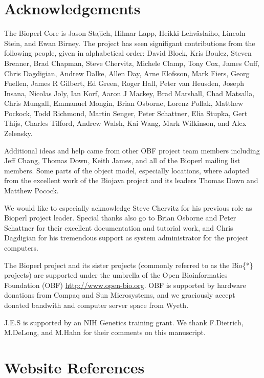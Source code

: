 \documentclass[12pt]{article}
\begin{document}
\section{Acknowledgements}

The Bioperl Core is Jason Stajich, Hilmar Lapp, Heikki
Lehv\"{a}slaiho, Lincoln Stein, and Ewan Birney.  The project has seen
signifigant contributions from the following people, given in
alphabetical order: David Block, Kris Boulez, Steven Brenner, Brad
Chapman, Steve Chervitz, Michele Clamp, Tony Cox, James Cuff, Chris
Dagdigian, Andrew Dalke, Allen Day, Arne Elofsson, Mark Fiers, Georg
Fuellen, James R Gilbert, Ed Green, Roger Hall, Peter van Heusden,
Joseph Insana, Nicolas Joly, Ian Korf, Aaron J Mackey, Brad Marshall,
Chad Matsalla, Chris Mungall, Emmanuel Mongin, Brian Osborne, Lorenz
Pollak, Matthew Pockock, Todd Richmond, Martin Senger, Peter
Schattner, Elia Stupka, Gert Thijs, Charles Tilford, Andrew Walsh, Kai
Wang, Mark Wilkinson, and Alex Zelensky.

Additional ideas and help came from other OBF project team members
including Jeff Chang, Thomas Down, Keith James, and all of the Bioperl
mailing list members. Some parts of the object model, especially
locations, where adopted from the excellent work of the Biojava
project and its leaders Thomas Down and Matthew Pocock.

We would like to especially acknowledge Steve Chervitz for his
previous role as Bioperl project leader.  Special thanks also go to
Brian Osborne and Peter Schattner for their excellent documentation
and tutorial work, and Chris Dagdigian for his tremendous support as
system administrator for the project computers.

The Bioperl project and its sister projects (commonly referred to as
the Bio\{*\} projects) are supported under the umbrella of the Open
Bioinformatics Foundation (OBF) \url{http://www.open-bio.org}.
OBF is supported by hardware donations from Compaq and Sun
Microsystems, and we graciously accept donated bandwith and computer
server space from Wyeth.

J.E.S is supported by an NIH Genetics training grant.  We thank
F.Dietrich, M.DeLong, and M.Hahn for their comments on this manuscript.


 

\newpage

\section{Website References}
\end{document}
